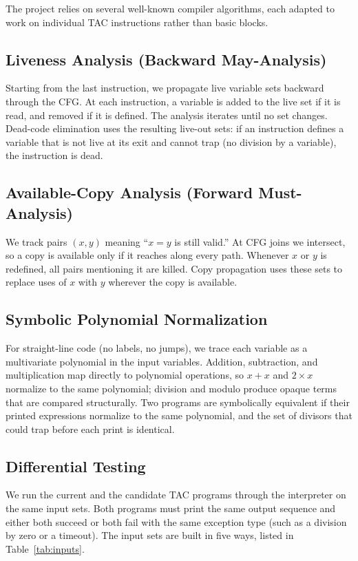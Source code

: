 \documentclass[12pt,a4paper]{report}
\begin{document}
The project relies on several well-known compiler algorithms, each adapted to work on individual TAC instructions rather than basic blocks.

\subsection{Liveness Analysis (Backward May-Analysis)}

Starting from the last instruction, we propagate live variable sets backward through the CFG. At each instruction, a variable is added to the live set if it is read, and removed if it is defined. The analysis iterates until no set changes. Dead-code elimination uses the resulting live-out sets: if an instruction defines a variable that is not live at its exit and cannot trap (no division by a variable), the instruction is dead.

\subsection{Available-Copy Analysis (Forward Must-Analysis)}

We track pairs $(x, y)$ meaning ``$x = y$ is still valid.'' At CFG joins we intersect, so a copy is available only if it reaches along every path. Whenever $x$ or $y$ is redefined, all pairs mentioning it are killed. Copy propagation uses these sets to replace uses of $x$ with $y$ wherever the copy is available.

\subsection{Symbolic Polynomial Normalization}

For straight-line code (no labels, no jumps), we trace each variable as a multivariate polynomial in the input variables. Addition, subtraction, and multiplication map directly to polynomial operations, so $x + x$ and $2 \times x$ normalize to the same polynomial; division and modulo produce opaque terms that are compared structurally. Two programs are symbolically equivalent if their printed expressions normalize to the same polynomial, and the set of divisors that could trap before each print is identical.

\subsection{Differential Testing}

We run the current and the candidate TAC programs through the interpreter on the same input sets. Both programs must print the same output sequence and either both succeed or both fail with the same exception type (such as a division by zero or a timeout). The input sets are built in five ways, listed in Table~\ref{tab:inputs}.
\end{document}
